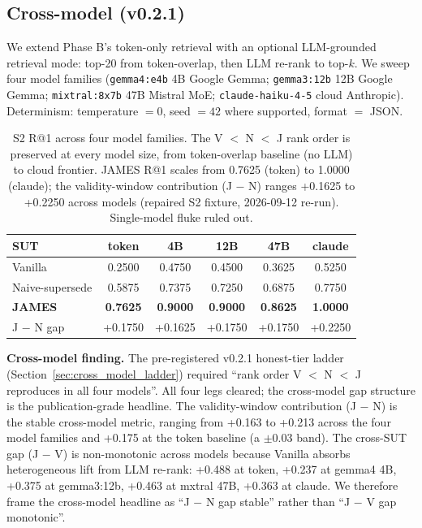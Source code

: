 \documentclass[11pt,a4paper]{article}
\begin{document}
\subsection{Cross-model (v0.2.1)}
\label{sec:cross_model}

We extend Phase B's token-only retrieval with an optional LLM-grounded retrieval mode: top-20 from token-overlap, then LLM re-rank to top-$k$. We sweep four model families (\texttt{gemma4:e4b} 4B Google Gemma; \texttt{gemma3:12b} 12B Google Gemma; \texttt{mixtral:8x7b} 47B Mistral MoE; \texttt{claude-haiku-4-5} cloud Anthropic). Determinism: temperature $=0$, seed $=42$ where supported, format $=$ JSON.

\begin{table}[h]
\centering
\caption{S2 R@1 across four model families. The V $<$ N $<$ J rank order is preserved at every model size, from token-overlap baseline (no LLM) to cloud frontier. JAMES R@1 scales from 0.7625 (token) to 1.0000 (claude); the validity-window contribution (J $-$ N) ranges +0.1625 to +0.2250 across models (repaired S2 fixture, 2026-09-12 re-run). Single-model fluke ruled out.}
\label{tab:cross_model}
\begin{tabular}{l c c c c c}
\toprule
\textbf{SUT} & \textbf{token} & \textbf{4B} & \textbf{12B} & \textbf{47B} & \textbf{claude} \\
\midrule
Vanilla & 0.2500 & 0.4750 & 0.4500 & 0.3625 & 0.5250 \\
Naive-supersede & 0.5875 & 0.7375 & 0.7250 & 0.6875 & 0.7750 \\
\textbf{JAMES} & \textbf{0.7625} & \textbf{0.9000} & \textbf{0.9000} & \textbf{0.8625} & \textbf{1.0000} \\
\midrule
J $-$ N gap & +0.1750 & +0.1625 & +0.1750 & +0.1750 & +0.2250 \\
\bottomrule
\end{tabular}
\end{table}

\textbf{Cross-model finding.} The pre-registered v0.2.1 honest-tier ladder (Section~\ref{sec:cross_model_ladder}) required ``rank order V $<$ N $<$ J reproduces in all four models''. All four legs cleared; the cross-model gap structure is the publication-grade headline. The validity-window contribution (J $-$ N) is the stable cross-model metric, ranging from +0.163 to +0.213 across the four model families and +0.175 at the token baseline (a $\pm$0.03 band). The cross-SUT gap (J $-$ V) is non-monotonic across models because Vanilla absorbs heterogeneous lift from LLM re-rank: +0.488 at token, +0.237 at gemma4 4B, +0.375 at gemma3:12b, +0.463 at mxtral 47B, +0.363 at claude. We therefore frame the cross-model headline as ``J $-$ N gap stable'' rather than ``J $-$ V gap monotonic''.
\end{document}
